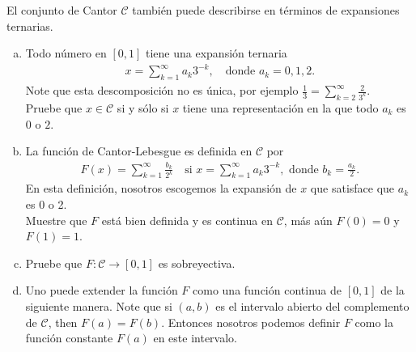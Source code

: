 El conjunto de Cantor $\mathcal{C}$ también puede describirse en términos de expansiones ternarias.
\begin{enumerate}[a)]
  \item Todo número en $[0,1]$ tiene una expansión ternaria
    \begin{align*}
      x=\sum_{k=1}^{\infty}a_{k}3^{-k},\quad \text{donde $a_{k}=0,1,2$.}
    \end{align*}
    Note que esta descomposición no es única, por ejemplo $\frac{1}{3}=\sum_{k=2}^{\infty}\frac{2}{3^{k}}$.\\
    Pruebe que $x\in\mathcal{C}$ si y sólo si $x$ tiene una representación en la que todo $a_{k}$ es $0$ o $2$.
  \item La función de Cantor-Lebesgue es definida en $\mathcal{C}$ por
    \begin{align*}
      F(x)=\sum_{k=1}^{\infty}\frac{b_{k}}{2^{k}}\quad\text{si }x=\sum_{k=1}^{\infty}a_{k}3^{-k},\text{ donde }b_{k}=\frac{a_{k}}{2}.
    \end{align*}
    En esta definición, nosotros escogemos la expansión de $x$ que satisface que $a_{k}$ es 0 o 2.\\
    Muestre que $F$ está bien definida y es continua en $\mathcal{C}$, más aún $F(0)=0$ y $F(1)=1$.
  \item Pruebe que $F:\mathcal{C}\to [0,1]$ es sobreyectiva.
  \item Uno puede extender la función $F$ como una función continua de $[0,1]$ de la siguiente manera. Note que si $(a,b)$ es el intervalo abierto del complemento de $\mathcal{C}$, then $F(a)=F(b)$. Entonces nosotros podemos definir $F$ como la función constante $F(a)$ en este intervalo. 
\end{enumerate}
